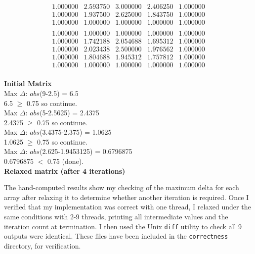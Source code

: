 \documentclass[12pt]{article}
\begin{document}
\begin{minipage}{.5\textwidth}
$$\begin{matrix}
1.000000 & 2.593750 & 3.000000 & 2.406250 & 1.000000 \\ 
1.000000 & 1.937500 & 2.625000 & 1.843750 & 1.000000 \\ 
1.000000 & 1.000000 & 1.000000 & 1.000000 & 1.000000 \\ 
\end{matrix}
$$
$$
\begin{matrix}
1.000000 & 1.000000 & 1.000000 & 1.000000 & 1.000000 \\ 
1.000000 & 1.742188 & 2.054688 & 1.695312 & 1.000000 \\ 
1.000000 & 2.023438 & 2.500000 & 1.976562 & 1.000000 \\ 
1.000000 & 1.804688 & 1.945312 & 1.757812 & 1.000000 \\ 
1.000000 & 1.000000 & 1.000000 & 1.000000 & 1.000000 \\
\end{matrix}
$$
\end{minipage}\hspace{1.5cm}
\begin{minipage}{.5\textwidth}
\vspace{0.6cm}
	\textbf{Initial Matrix}\\[1.9cm]
	Max $\Delta$: $abs$(9-2.5) = 6.5\\
	6.5 $\geq$ 0.75 so continue.\\[1.6cm]
	
	Max $\Delta$: $abs$(5-2.5625) = 2.4375\\
	2.4375 $\geq$ 0.75 so continue.\\[1.6cm]
	
	Max $\Delta$: $abs$(3.4375-2.375) = 1.0625\\
	1.0625 $\geq$ 0.75 so continue.\\[1.6cm]
	
	Max $\Delta$: $abs$(2.625-1.9453125) = 0.6796875\\
	0.6796875 $<$ 0.75 (done).\\[1.9cm]
	\textbf{Relaxed matrix (after 4 iterations)}
\end{minipage}

The hand-computed results show my checking of the maximum delta for each array after relaxing it to determine whether another iteration is required. Once I verified that my implementation was correct with one thread, I relaxed under the same conditions with 2-9 threads, printing all intermediate values and the iteration count at termination. I then used the Unix \texttt{diff} utility to check all 9 outputs were identical. These files have been included in the \texttt{correctness} directory, for verification.
\end{document}

